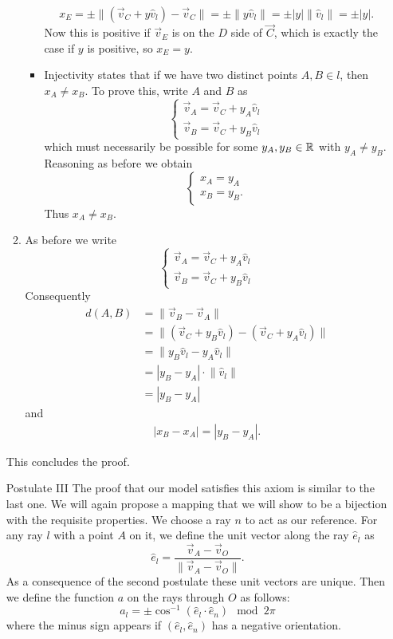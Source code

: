 \begin{enumerate}
\begin{enumerate}
\begin{itemize}
\[ x_E = \pm\lVert (\vec{v}_C + y \hat{v}_l) - \vec{v}_C \lVert = \pm\lVert y \hat{v}_l \lVert = \pm |y| \lVert \hat{v}_l \lVert = \pm |y|. \]
Now this is positive if $\vec{v}_E$ is on the $D$ side of $\vec{C}$, which is exactly the case if $y$ is positive, so $x_E = y$.
\item Injectivity states that if we have two distinct points $A,B\in l$, then $x_A \neq x_B$. To prove this, write $A$ and $B$ as
\[ \begin{cases}
\vec{v}_A = \vec{v}_C + y_A \hat{v}_l \\
\vec{v}_B = \vec{v}_C + y_B \hat{v}_l
\end{cases} \]
which must necessarily be possible for some $y_A, y_B \in \mathbb{R}$ with $y_A\neq y_B$. Reasoning as before we obtain
\[ \begin{cases}
x_A = y_A \\ x_B = y_B.
\end{cases} \]
Thus $x_A \neq x_B$.
\end{itemize}
\item As before we write
\[ \begin{cases}
\vec{v}_A = \vec{v}_C + y_A \hat{v}_l \\
\vec{v}_B = \vec{v}_C + y_B \hat{v}_l
\end{cases} \]
Consequently
\begin{align}
d(A,B) &= \lVert \vec{v}_B - \vec{v}_A\lVert \\
&= \lVert (\vec{v}_C + y_B \hat{v}_l) - (\vec{v}_C + y_A \hat{v}_l)\lVert \\
&= \lVert y_B \hat{v}_l - y_A \hat{v}_l\lVert \\
&= |y_B - y_A|\cdot\lVert \hat{v}_l\lVert \\
&= |y_B - y_A|
\end{align}
and
\begin{align}
|x_B - x_A| = |y_B - y_A|.
\end{align}
\end{enumerate}
This concludes the proof.
\item[Postulate III] The proof that our model satisfies this axiom is similar to the last one. We will again propose a mapping that we will show to be a bijection with the requisite properties. We choose a ray $n$ to act as our reference. For any ray $l$ with a point $A$ on it, we define the unit vector along the ray $\hat{e}_l$ as
\[ \hat{e}_l = \frac{\vec{v}_A - \vec{v}_O}{\lVert \vec{v}_A - \vec{v}_O \lVert}. \]
As a consequence of the second postulate these unit vectors are unique.
Then we define the function $a$ on the rays through $O$ as follows:
\[ a_l = \pm \cos^{-1}(\hat{e}_l \cdot \hat{e}_n) \mod 2\pi \]
where the minus sign appears if $(\hat{e}_l, \hat{e}_n)$ has a negative orientation.


\end{enumerate}
